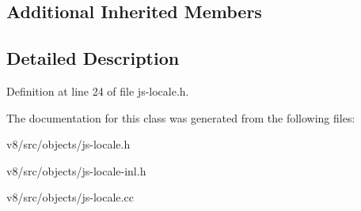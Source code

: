 \subsection*{Additional Inherited Members}


\subsection{Detailed Description}


Definition at line 24 of file js-\/locale.\+h.



The documentation for this class was generated from the following files\+:\begin{DoxyCompactItemize}
\item 
v8/src/objects/js-\/locale.\+h\item 
v8/src/objects/js-\/locale-\/inl.\+h\item 
v8/src/objects/js-\/locale.\+cc\end{DoxyCompactItemize}
